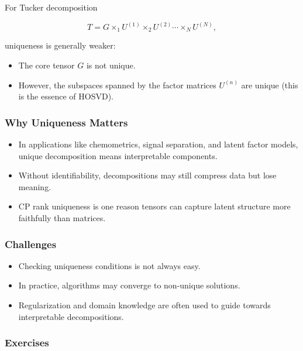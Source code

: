 \documentclass[
  letterpaper,
  DIV=11,
  numbers=noendperiod]{scrreprt}
\providecommand{\tightlist}{%
  \setlength{\itemsep}{0pt}\setlength{\parskip}{0pt}}
\begin{document}
For Tucker decomposition

\[
T = G \times_1 U^{(1)} \times_2 U^{(2)} \cdots \times_N U^{(N)},
\]

uniqueness is generally weaker:

\begin{itemize}
\tightlist
\item
  The core tensor \(G\) is not unique.
\item
  However, the subspaces spanned by the factor matrices \(U^{(n)}\) are
  unique (this is the essence of HOSVD).
\end{itemize}

\subsubsection{Why Uniqueness Matters}\label{why-uniqueness-matters}

\begin{itemize}
\tightlist
\item
  In applications like chemometrics, signal separation, and latent
  factor models, unique decomposition means interpretable components.
\item
  Without identifiability, decompositions may still compress data but
  lose meaning.
\item
  CP rank uniqueness is one reason tensors can capture latent structure
  more faithfully than matrices.
\end{itemize}

\subsubsection{Challenges}\label{challenges}

\begin{itemize}
\tightlist
\item
  Checking uniqueness conditions is not always easy.
\item
  In practice, algorithms may converge to non-unique solutions.
\item
  Regularization and domain knowledge are often used to guide towards
  interpretable decompositions.
\end{itemize}

\subsubsection{Exercises}\label{exercises-48}
\end{document}
